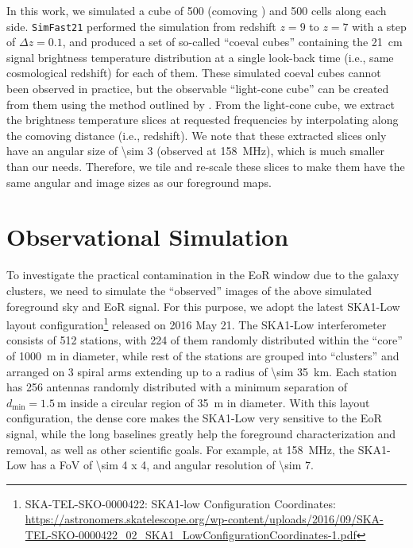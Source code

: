 \documentclass[modern]{aastex61}
\newcommand{\R}[1]{\mathrm{#1}}
\begin{document}
In this work, we simulated a cube of \SI{500}{\cMpc} (comoving \si{\Mpc})
and 500 cells along each side.  \texttt{SimFast21} performed the
simulation from redshift $z=9$ to $z=7$ with a step of $\Delta z = 0.1$,
and produced a set of so-called \enquote{coeval cubes} containing the
\SI{21}{\cm} signal brightness temperature distribution at a single
look-back time (i.e., same cosmological redshift) for each of them.
These simulated coeval cubes cannot been observed in practice, but the
observable \enquote{light-cone cube} can be created from them using the
method outlined by \citet{datta2012}.
From the light-cone cube, we extract the brightness temperature slices
at requested frequencies by interpolating along the comoving distance
(i.e., redshift).
We note that these extracted slices only have an angular size of
\SI{\sim 3}{\deg} (observed at \SI{158}{\MHz}), which is much smaller
than our needs.  Therefore, we tile and re-scale these slices to make
them have the same angular and image sizes as our foreground maps.


\section{Observational Simulation}
\label{sec:obs-simu}

To investigate the practical contamination in the EoR window due to the
galaxy clusters, we need to simulate the \enquote{observed} images of
the above simulated foreground sky and EoR signal.
For this purpose,
we adopt the latest SKA1-Low layout configuration\footnote{%
  SKA-TEL-SKO-0000422: SKA1-low Configuration Coordinates: \url{https://astronomers.skatelescope.org/wp-content/uploads/2016/09/SKA-TEL-SKO-0000422_02_SKA1_LowConfigurationCoordinates-1.pdf}}
released on 2016 May 21.
The SKA1-Low interferometer consists of 512 stations, with 224 of them
randomly distributed within the \enquote{core} of \SI{1000}{\meter} in
diameter, while rest of the stations are grouped into \enquote{clusters}
and arranged on 3 spiral arms extending up to a radius of
\SI{\sim 35}{\kilo\meter}.
Each station has 256 antennas randomly distributed with a minimum separation
of $d_{\R{min}} = \SI{1.5}{\meter}$ inside a circular region of
\SI{35}{\meter} in diameter.
With this layout configuration, the dense core makes the SKA1-Low very
sensitive to the EoR signal, while the long baselines greatly help the
foreground characterization and removal, as well as other scientific goals.
For example, at \SI{158}{\MHz}, the SKA1-Low has a FoV of
\SI{\sim 4 x 4}{\deg}, and angular resolution of \SI{\sim 7}{\arcsec}.
\end{document}
